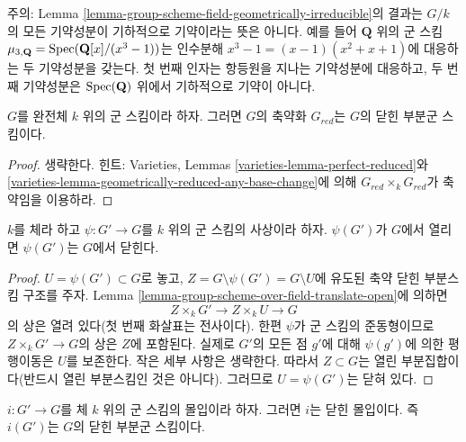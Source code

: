 \begin{remark}
\label{remark-warning-group-scheme-geometrically-irreducible}
주의: Lemma \ref{lemma-group-scheme-field-geometrically-irreducible}의 결과는 $G/k$의 모든 기약성분이
기하적으로 기약이라는 뜻은 아니다. 예를 들어 $\mathbf{Q}$ 위의 군 스킴
$\mu_{3, \mathbf{Q}} = \mathop{\mathrm{Spec}}(\mathbf{Q}[x]/(x^3 - 1))$는 인수분해
$x^3 - 1 = (x - 1)(x^2 + x + 1)$에 대응하는 두 기약성분을 갖는다.
첫 번째 인자는 항등원을 지나는 기약성분에 대응하고, 두 번째 기약성분은
$\mathop{\mathrm{Spec}}(\mathbf{Q})$ 위에서 기하적으로 기약이 아니다.
\end{remark}

\begin{lemma}
\label{lemma-reduced-subgroup-scheme-perfect}
$G$를 완전체 $k$ 위의 군 스킴이라 하자. 그러면 $G$의 축약화 $G_{red}$는
$G$의 닫힌 부분군 스킴이다.
\end{lemma}

\begin{proof}
생략한다. 힌트: Varieties, Lemmas \ref{varieties-lemma-perfect-reduced}와
\ref{varieties-lemma-geometrically-reduced-any-base-change}에 의해
$G_{red} \times_k G_{red}$가 축약임을 이용하라.
\end{proof}

\begin{lemma}
\label{lemma-open-subgroup-closed-over-field}
$k$를 체라 하고 $\psi : G' \to G$를 $k$ 위의 군 스킴의 사상이라 하자.
$\psi(G')$가 $G$에서 열리면 $\psi(G')$는 $G$에서 닫힌다.
\end{lemma}

\begin{proof}
$U = \psi(G') \subset G$로 놓고, $Z = G \setminus \psi(G') = G \setminus U$에 유도된 축약 닫힌 부분스킴
구조를 주자. Lemma \ref{lemma-group-scheme-over-field-translate-open}에 의하면
$$
Z \times_k G' \longrightarrow
Z \times_k U \longrightarrow G
$$
의 상은 열려 있다(첫 번째 화살표는 전사이다). 한편 $\psi$가 군 스킴의 준동형이므로
$Z \times_k G' \to G$의 상은 $Z$에 포함된다. 실제로 $G'$의 모든 점 $g'$에 대해
$\psi(g')$에 의한 평행이동은 $U$를 보존한다. 작은 세부 사항은 생략한다.
따라서 $Z \subset G$는 열린 부분집합이다(반드시 열린 부분스킴인 것은 아니다).
그러므로 $U = \psi(G')$는 닫혀 있다.
\end{proof}

\begin{lemma}
\label{lemma-immersion-group-schemes-closed-over-field}
$i : G' \to G$를 체 $k$ 위의 군 스킴의 몰입이라 하자. 그러면 $i$는 닫힌 몰입이다. 즉
$i(G')$는 $G$의 닫힌 부분군 스킴이다.
\end{lemma}

